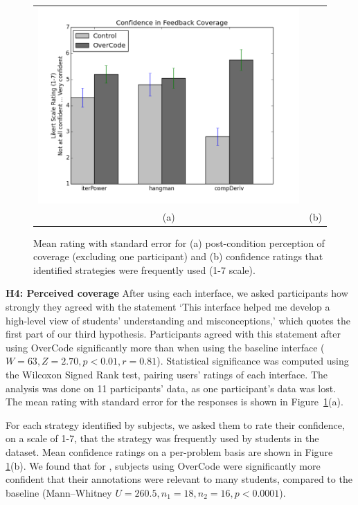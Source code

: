 \begin{figure}[t!]
\begin{tabular}{c | c}
\begin{minipage}{.5\linewidth}
\includegraphics[width=\linewidth]{Body/figures/overcode/coverageConfidence.png}
\end{minipage}
\\
(a) & (b)
\end{tabular}
\caption{Mean rating with standard error for (a) post-condition perception of coverage (excluding one participant) and (b) confidence ratings that identified strategies were frequently used (1-7 scale).}
\label{perceivedCoverage}
\end{figure}

{\bf H4: Perceived coverage} After using each interface, we asked participants how strongly they agreed with the statement `This interface helped me develop a high-level view of students' understanding and misconceptions,' which quotes the first part of our third hypothesis. Participants agreed with this statement after using OverCode significantly more than when using the baseline interface ($W=63, Z=2.70, p<0.01, r=0.81$). Statistical significance was computed using the Wilcoxon Signed Rank test, pairing users' ratings of each interface. The analysis was done on 11 participants' data, as one participant's data was lost. The mean rating with standard error for the responses is shown in Figure~\ref{perceivedCoverage}(a). 

For each strategy identified by subjects, we asked them to rate their confidence, on a scale of 1-7, that the strategy was frequently used by students in the dataset. Mean confidence ratings on a per-problem basis are shown in Figure \ref{perceivedCoverage}(b). We found that for , subjects using OverCode were significantly more confident that their annotations were relevant to many students, compared to the baseline (Mann--Whitney $U=260.5, n_{1}=18, n_{2}=16, p<0.0001$).
 
